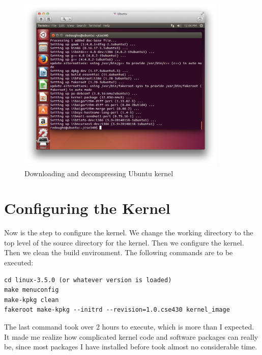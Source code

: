 \documentclass[12pt]{article}
\newcommand{\imagesize}{100mm}
\begin{document}
\begin{figure}
\centering
\includegraphics[width=\imagesize]{6.jpg}
\caption{Downloading and decompressing Ubuntu kernel}
\end{figure}

\newpage

\section{Configuring the Kernel}
Now is the step to configure the kernel. We change the working directory to the top level of the source directory for the kernel. Then we configure the kernel. Then we clean the build environment. The following commands are to be executed:

\begin{verbatim}
cd linux-3.5.0 (or whatever version is loaded)
make menuconfig
make-kpkg clean
fakeroot make-kpkg --initrd --revision=1.0.cse430 kernel_image
\end{verbatim}

The last command took over 2 hours to execute, which is more than I expected. It made me realize how complicated kernel code and software packages can really be, since most packages I have installed before took almost no considerable time.
\end{document}
